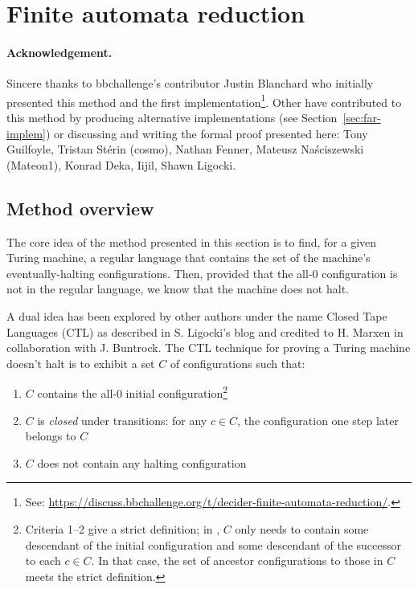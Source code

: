 
\newpage
\section{Finite automata reduction}\label{sec:finite-automata-reduction}

\paragraph{Acknowledgement.} Sincere thanks to bbchallenge's contributor Justin Blanchard who initially presented this method and the first implementation\footnote{See: \url{https://discuss.bbchallenge.org/t/decider-finite-automata-reduction/}.}. Other have contributed to this method by producing alternative implementations (see Section~\ref{sec:far-implem}) or discussing and writing the formal proof presented here: Tony Guilfoyle, Tristan Stérin (cosmo), Nathan Fenner, Mateusz Naściszewski (Mateon1), Konrad Deka, Iijil, Shawn Ligocki. %


\subsection{Method overview}\label{far-overview}

The core idea of the method presented in this section is to find, for a given Turing machine, a regular language that contains the set of the machine's eventually-halting configurations. Then, provided that the all-0 configuration is not in the regular language, we know that the machine does not halt.

A dual idea has been explored by other authors under the name Closed Tape Languages (CTL) as described in S. Ligocki's blog \cite{ShawnCTL} and credited to H. Marxen in collaboration with J. Buntrock.
The CTL technique for proving a Turing machine doesn't halt is to exhibit a set $C$ of configurations such that:

\begin{enumerate}
  \item $C$ contains the all-0 initial configuration\footnote{
          Criteria 1--2 give a strict definition; in \cite{ShawnCTL}, $C$ only needs to contain some descendant of the initial configuration and some descendant of the successor to each $c\in C$.
          In that case, the set of ancestor configurations to those in $C$ meets the strict definition.
        }
  \item $C$ is \textit{closed} under transitions: for any $c \in C$, the configuration one step later belongs to $C$\addtocounter{footnote}{-1}\addtocounter{Hfootnote}{-1}\footnotemark
  \item $C$ does not contain any halting configuration
\end{enumerate}


